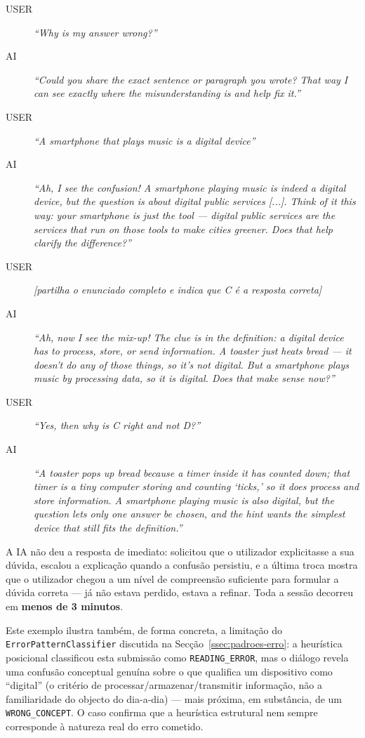 \begin{sloppypar}
\begin{description}
	\item[\small USER] \small \emph{``Why is my answer wrong?''}
	\item[\small AI]   \small \emph{``Could you share the exact sentence or paragraph you wrote? That way I can see exactly where the misunderstanding is and help fix it.''}
	\item[\small USER] \small \emph{``A smartphone that plays music is a digital device''}
	\item[\small AI]   \small \emph{``Ah, I see the confusion! A smartphone playing music is indeed a digital device, but the question is about digital public services \textnormal{[...]}. Think of it this way: your smartphone is just the tool --- digital public services are the services that run on those tools to make cities greener. Does that help clarify the difference?''}
	\item[\small USER] \small \emph{[partilha o enunciado completo e indica que C é a resposta correta]}
	\item[\small AI]   \small \emph{``Ah, now I see the mix-up! The clue is in the definition: a digital device has to process, store, or send information. A toaster just heats bread --- it doesn't do any of those things, so it's not digital. But a smartphone plays music by processing data, so it is digital. Does that make sense now?''}
	\item[\small USER] \small \emph{``Yes, then why is C right and not D?''}
	\item[\small AI]   \small \emph{``A toaster pops up bread because a timer inside it has counted down; that timer is a tiny computer storing and counting `ticks,' so it does process and store information. A smartphone playing music is also digital, but the question lets only one answer be chosen, and the hint wants the simplest device that still fits the definition.''}
\end{description}
\end{sloppypar}

\medskip
A IA não deu a resposta de imediato: solicitou que o utilizador explicitasse a sua dúvida, escalou a explicação quando a confusão persistiu, e a última troca mostra que o utilizador chegou a um nível de compreensão suficiente para formular a dúvida correta --- já não estava perdido, estava a refinar. Toda a sessão decorreu em \textbf{menos de 3 minutos}.

Este exemplo ilustra também, de forma concreta, a limitação do \texttt{ErrorPatternClassifier} discutida na Secção~\ref{ssec:padroes-erro}: a heurística posicional classificou esta submissão como \texttt{READING\_ERROR}, mas o diálogo revela uma confusão conceptual genuína sobre o que qualifica um dispositivo como ``digital'' (o critério de processar/armazenar/transmitir informação, não a familiaridade do objecto do dia-a-dia) --- mais próxima, em substância, de um \texttt{WRONG\_CONCEPT}. O caso confirma que a heurística estrutural nem sempre corresponde à natureza real do erro cometido.


